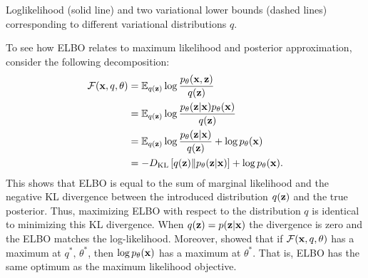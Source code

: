 \begin{marginfigure}[-0.1\baselineskip]
\caption{Loglikelihood (solid line) and two variational lower bounds (dashed lines) corresponding to different variational distributions $q$.}\label{fig:intro_bound}
\end{marginfigure}

To see how ELBO relates to maximum likelihood and posterior approximation,  consider the following decomposition:
\begin{equation}
\begin{aligned}
    \mathcal{F}({\mathbf{x}}, q, \theta) &= \mathbb{E}_{q({\mathbf{z}})}\log  \frac{p_{\theta}({\mathbf{x}},{\mathbf{z}})}{q({\mathbf{z}})} \\
    & = \mathbb{E}_{q({\mathbf{z}})}\log  \frac{p_{\theta}({\mathbf{z}}|{\mathbf{x}})p_{\theta}({\mathbf{x}})}{q({\mathbf{z}})} \\
    & = \mathbb{E}_{q({\mathbf{z}})}\log  \frac{p_{\theta}({\mathbf{z}}|{\mathbf{x}})}{q({\mathbf{z}})} +  \log p_{\theta}({\mathbf{x}})\\
    & = - D_{\mathrm{KL}}\left[q({\mathbf{z}})\|p_{\theta}({\mathbf{z}}|{\mathbf{x}})\right] + \log p_{\theta}({\mathbf{x}}).\\
\end{aligned}
\end{equation}
This shows that ELBO is equal to the sum of marginal likelihood and the negative KL divergence between the introduced distribution $q({\mathbf{z}})$ and the true posterior.
Thus,  maximizing ELBO with respect to the distribution $q$ is identical to minimizing this KL divergence. When $q({\mathbf{z}}) = p({\mathbf{z}}|{\mathbf{x}})$ the divergence is zero and the ELBO matches the log-likelihood.
Moreover, \citet{neal1998view} showed that if $\mathcal{F}({\mathbf{x}}, q, \theta) $ has a maximum at $q^*, \, \theta^*$, then $\log p_{\theta}({\mathbf{x}})$ has a maximum at $\theta^*$. That is, ELBO has the same optimum as the maximum likelihood objective. 

